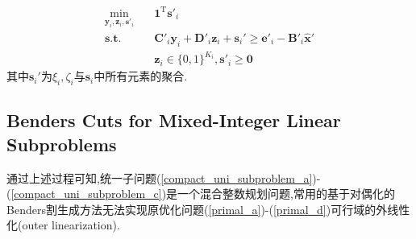 \documentclass{article}
\begin{document}
\begin{subequations}
    \begin{align}
        \min_{\mathbf{y}_{i}, \mathbf{z}_{i}, \mathbf{s}'_{i}}\quad& \mathbf{1}^{\mathrm{T}}\mathbf{s}'_{i} \label{compact_uni_subproblem_a} \\
        \mathbf{s.t.}\quad& \mathbf{C}'{}_i\mathbf{y}_{i}+\mathbf{D}'{}_{i}\mathbf{z}_{i}+\mathbf{s}_{i}'\geq\mathbf{e}'{}_{i}-\mathbf{B}'{}_{i}\mathbf{\hat{x}}' \label{compact_uni_subproblem_b} \\
        &\mathbf{z}_{i}\in\{0, 1\}^{K_{i}}, \mathbf{s}'_i\geq\mathbf{0} \label{compact_uni_subproblem_c}
    \end{align}
\end{subequations}
其中$\mathbf{s}_i'$为$\xi_i,\zeta_i$与$\mathbf{s}_i$中所有元素的聚合.

\subsection{Benders Cuts for Mixed-Integer Linear Subproblems}
通过上述过程可知,统一子问题(\ref{compact_uni_subproblem_a})-(\ref{compact_uni_subproblem_c})是一个混合整数规划问题,常用的基于对偶化的Benders割生成方法无法实现原优化问题(\ref{primal_a})-(\ref{primal_d})可行域的外线性化(outer linearization).
\end{document}
